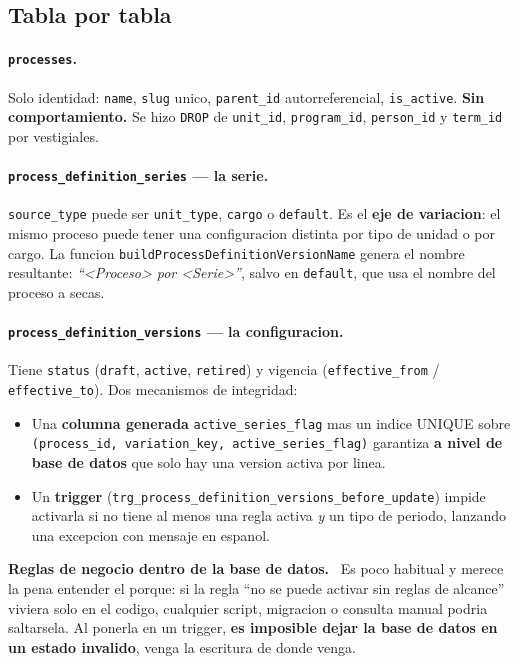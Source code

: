 \documentclass[11pt,a4paper,oneside]{report}
\newenvironment{concepto}[1][Concepto para juniors]{%
  \par\medskip
  \colorlet{shadecolor}{blue!7}%
  \begin{shaded}\noindent\textbf{\color{blue!55!black}#1.}\ \ignorespaces}%
  {\end{shaded}\par\medskip}
\newcommand{\rt}[1]{\texttt{#1}}
\begin{document}
\subsection{Tabla por tabla}

\paragraph{\rt{processes}.} Solo identidad: \rt{name}, \rt{slug} unico, \rt{parent\_id}
autorreferencial, \rt{is\_active}. \textbf{Sin comportamiento.} Se hizo \rt{DROP} de
\rt{unit\_id}, \rt{program\_id}, \rt{person\_id} y \rt{term\_id} por vestigiales.

\paragraph{\rt{process\_definition\_series} --- la serie.}
\rt{source\_type} puede ser \rt{unit\_type}, \rt{cargo} o \rt{default}. Es el \textbf{eje de
variacion}: el mismo proceso puede tener una configuracion distinta por tipo de unidad o por
cargo. La funcion \rt{buildProcessDefinitionVersionName} genera el nombre resultante:
\emph{``<Proceso> por <Serie>''}, salvo en \rt{default}, que usa el nombre del proceso a secas.

\paragraph{\rt{process\_definition\_versions} --- la configuracion.}
Tiene \rt{status} (\rt{draft}, \rt{active}, \rt{retired}) y vigencia
(\rt{effective\_from} / \rt{effective\_to}). Dos mecanismos de integridad:

\begin{itemize}[leftmargin=1.4em]
  \item Una \textbf{columna generada} \rt{active\_series\_flag} mas un indice UNIQUE sobre
        \rt{(process\_id, variation\_key, active\_series\_flag)} garantiza \textbf{a nivel de
        base de datos} que solo hay una version activa por linea.
  \item Un \textbf{trigger} (\rt{trg\_process\_definition\_versions\_before\_update}) impide
        activarla si no tiene al menos una regla activa \emph{y} un tipo de periodo, lanzando
        una excepcion con mensaje en espanol.
\end{itemize}

\begin{concepto}[Reglas de negocio dentro de la base de datos]
Es poco habitual y merece la pena entender el porque: si la regla ``no se puede activar sin
reglas de alcance'' viviera solo en el codigo, cualquier script, migracion o consulta manual
podria saltarsela. Al ponerla en un trigger, \textbf{es imposible dejar la base de datos en un
estado invalido}, venga la escritura de donde venga.
\end{concepto}
\end{document}
